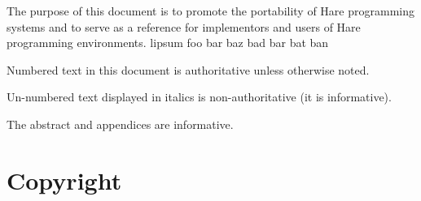 
\specitem
The purpose of this document is to promote the portability of Hare programming
systems and to serve as a reference for implementors and users of Hare
programming environments. lipsum foo bar baz bad bar bat ban

\specitem
Numbered text in this document is authoritative unless otherwise noted.

\specitem
Un-numbered text displayed in italics is non-authoritative (it is informative).


\specitem
The abstract and appendices are informative.

\section{Copyright}

